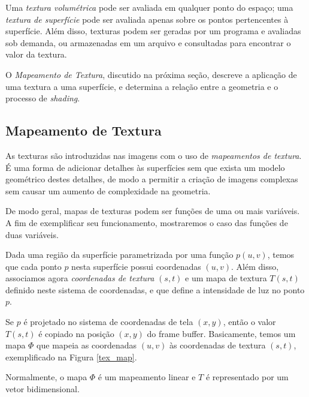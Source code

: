 \documentclass[12pt, a4paper, oneside]{book}
\begin{document}
Uma {\it textura volumétrica} pode ser avaliada em qualquer ponto do espaço; uma {\it textura de superfície} pode ser avaliada apenas sobre os pontos pertencentes à superfície. Além disso, texturas podem ser geradas por um programa e avaliadas sob demanda, ou armazenadas em um arquivo e consultadas para encontrar o valor da textura.

O {\it Mapeamento de Textura}, discutido na próxima seção, descreve a aplicação de uma textura a uma superfície, e determina a relação entre a geometria e o processo de {\it shading}.

\subsection{Mapeamento de Textura}

As texturas são introduzidas nas imagens com o uso de {\it mapeamentos de textura}. É uma forma de adicionar detalhes às superfícies sem que exista um modelo geométrico destes detalhes, de modo a permitir a criação de imagens complexas sem causar um aumento de complexidade na geometria.

De modo geral, mapas de texturas podem ser funções de uma ou mais variáveis. A fim de exemplificar seu funcionamento, mostraremos o caso das funções de duas variáveis.

Dada uma região da superfície parametrizada por uma função $p(u,v)$, temos que cada ponto $p$ nesta superfície possui coordenadas $(u,v)$. Além disso, associamos agora {\it coordenadas de textura} $(s,t)$ e um mapa de textura $T(s,t)$ definido neste sistema de coordenadas, e que define a intensidade de luz no ponto $p$. 

Se $p$ é projetado no sistema de coordenadas de tela $(x,y)$, então o valor $T(s,t)$ é copiado na posição $(x,y)$ do frame buffer. Basicamente, temos um mapa $\Phi$ que mapeia as coordenadas $(u,v)$ às coordenadas de textura $(s,t)$, exemplificado na Figura \ref{tex_map}.

Normalmente, o mapa $\Phi$ é um mapeamento linear e $T$ é representado por um vetor bidimensional.
\end{document}
